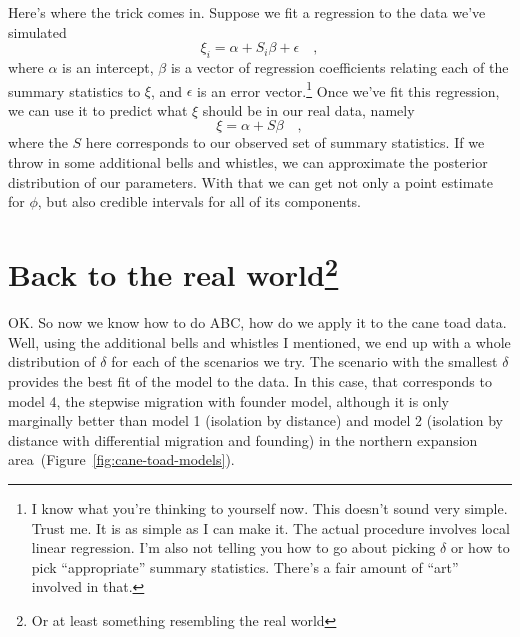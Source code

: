 Here's where the trick comes in. Suppose we fit a regression to the
data we've simulated
\[
\xi_i = \alpha + S_i\beta + \epsilon \quad ,
\]
where $\alpha$ is an intercept, $\beta$ is a vector of regression
coefficients relating each of the summary statistics to $\xi$, and
$\epsilon$ is an error vector.\footnote{I know what you're thinking to
  yourself now. This doesn't sound very simple. Trust me. It is as
  simple as I can make it. The actual procedure involves local linear
  regression. I'm also not telling you how to go about picking
  $\delta$ or how to pick ``appropriate'' summary statistics. There's
  a fair amount of ``art'' involved in that.} Once we've fit this
regression, we can use it to predict what $\xi$ should be in our real
data, namely
\[
\xi = \alpha + S\beta \quad ,
\]
where the $S$ here corresponds to our observed set of summary
statistics. If we throw in some additional bells and whistles, we can
approximate the posterior distribution of our parameters. With that we
can get not only a point estimate for $\phi$, but also credible
intervals for all of its components.

\section*{Back to the real world\footnote{Or at least something
    resembling the real world}}

OK. So now we know how to do ABC, how do we apply it to the cane toad
data. Well, using the additional bells and whistles I mentioned, we
end up with a whole distribution of $\delta$ for each of the scenarios
we try. The scenario with the smallest $\delta$ provides the best fit
of the model to the data. In this case, that corresponds to model 4,
the stepwise migration with founder model, although it is only
marginally better than model 1 (isolation by distance) and model 2
(isolation by distance with differential migration and founding) in
the northern expansion area~(Figure~\ref{fig:cane-toad-models}).

